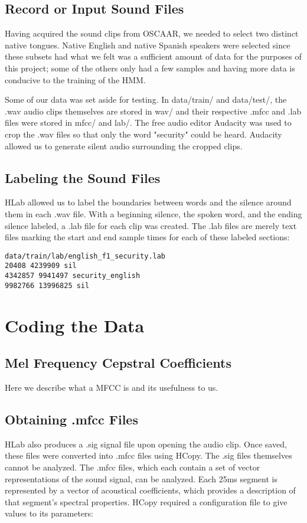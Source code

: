 \documentclass{wileySev}
\begin{document}
\section{Record or Input Sound Files}
Having acquired the sound clips from OSCAAR, we needed to select two distinct native tongues. Native English and native Spanish speakers were selected since these subsets had what we felt was a sufficient amount of data for the purposes of this project; some of the others only had a few samples and having more data is conducive to the training of the HMM.

Some of our data was set aside for testing. In data/train/ and data/test/, the .wav audio clips themselves are stored in wav/ and their respective .mfcc and .lab files were stored in mfcc/ and lab/. The free audio editor Audacity was used to crop the .wav files so that only the word "security" could be heard. Audacity allowed us to generate silent audio surrounding the cropped clips.

\section{Labeling the Sound Files}
HLab allowed us to label the boundaries between words and the silence around them in each .wav file. With a beginning silence, the spoken word, and the ending silence labeled, a .lab file for each clip was created. The .lab files are merely text files marking the start and end sample times for each of these labeled sections:

\begin{verbatim}
data/train/lab/english_f1_security.lab
20408 4239909 sil
4342857 9941497 security_english
9982766 13996825 sil
\end{verbatim}

\chapter{Coding the Data}

\section{Mel Frequency Cepstral Coefficients}
Here we describe what a MFCC is and its usefulness to us.

\section{Obtaining .mfcc Files}
HLab also produces a .sig signal file upon opening the audio clip. Once saved, these files were converted into .mfcc files using HCopy. The .sig files themselves cannot be analyzed. The .mfcc files, which each contain a set of vector representations of the sound signal, can be analyzed. Each 25ms segment is represented by a vector of acoustical coefficients, which provides a description of that segment's spectral properties. HCopy required a configuration file to give values to its parameters:
\end{document}
